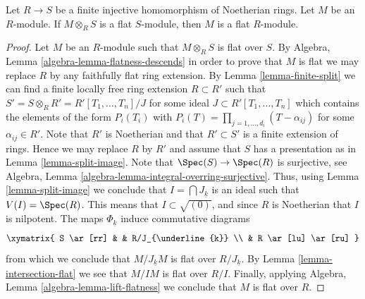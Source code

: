 \begin{lemma}
\label{lemma-descent-flatness-injective-finite-Noetherian-rings}
Let $R \to S$ be a finite injective homomorphism of Noetherian rings.
Let $M$ be an $R$-module. If $M \otimes_R S$ is a flat $S$-module,
then $M$ is a flat $R$-module.
\end{lemma}

\begin{proof}
Let $M$ be an $R$-module such that $M \otimes_R S$ is flat over $S$. By
Algebra, Lemma \ref{algebra-lemma-flatness-descends}
in order to prove that $M$ is flat we may replace $R$ by any faithfully flat
ring extension. By
Lemma \ref{lemma-finite-split}
we can find a finite locally free ring extension $R \subset R'$ such
that $S' = S \otimes_R R' = R'[T_1, \ldots, T_n]/J$ for some ideal
$J \subset R'[T_1, \ldots, T_n]$ which contains the  elements of the form
$P_i(T_i)$ with $P_i(T) = \prod_{j = 1, \ldots, d_i} (T - \alpha_{ij})$
for some $\alpha_{ij} \in R'$. Note that $R'$ is Noetherian
and that $R' \subset S'$ is a finite extension of rings. Hence we may
replace $R$ by $R'$ and assume that $S$ has a presentation as in
Lemma \ref{lemma-split-image}.
Note that $\Spec(S) \to \Spec(R)$ is surjective, see
Algebra, Lemma \ref{algebra-lemma-integral-overring-surjective}.
Thus, using
Lemma \ref{lemma-split-image}
we conclude that $I = \bigcap J_{\underline{k}}$ is an ideal
such that $V(I) = \Spec(R)$. This means that
$I \subset \sqrt{(0)}$, and since $R$ is Noetherian that $I$
is nilpotent. The maps $\Phi_{\underline{k}}$ induce commutative
diagrams
$$
\xymatrix{
S \ar[rr] & & R/J_{\underline{k}} \\
& R \ar[lu] \ar[ru]
}
$$
from which we conclude that $M/J_{\underline{k}}M$ is flat over
$R/J_{\underline{k}}$. By
Lemma \ref{lemma-intersection-flat}
we see that $M/IM$ is flat over $R/I$. Finally, applying
Algebra, Lemma \ref{algebra-lemma-lift-flatness}
we conclude that $M$ is flat over $R$.
\end{proof}
